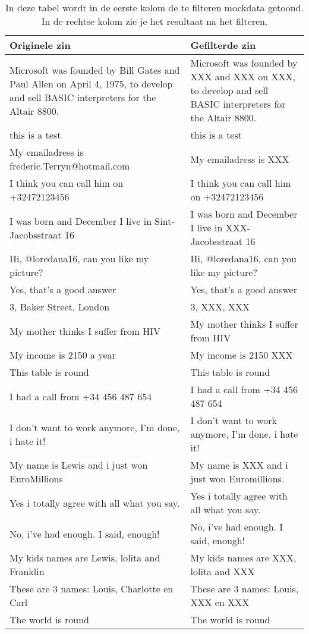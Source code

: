 \begin{table}
	\begin{tabularx}{\linewidth}{ |X|X| } 
	\hline
	Originele zin & Gefilterde zin \\ \hline \hline
	Microsoft was founded by Bill Gates and Paul Allen on April 4, 1975, to develop and sell BASIC interpreters for the Altair 8800. & Microsoft was founded by XXX and XXX on XXX, to develop and sell BASIC interpreters for the Altair 8800.\\
	this is a test & this is a test\\
	My emailadress is frederic.Terryn@hotmail.com &  My emailadress is XXX \\
	I think you can call him on +32472123456 & I think you can call him on +32472123456 \\
	I was born and December I live in Sint-Jacobsstraat 16 &  I was born and December I live in XXX-Jacobsstraat 16 \\
	Hi, @loredana16, can you like my picture? & Hi, @loredana16, can you like my picture? \\
	Yes, that's a good answer &  Yes, that's a good answer \\
	3, Baker Street, London & 3, XXX, XXX \\
	My mother thinks I suffer from HIV & My mother thinks I suffer from HIV \\
	My income is 2150 a year & My income is 2150 XXX \\
	This table is round &  This table is round \\
	I had a call from +34 456 487 654 &  I had a call from +34 456 487 654 \\
	I don't want to work anymore, I'm done, i hate it! &  I don't want to work anymore, I'm done, i hate it! \\
	My name is Lewis and i just won EuroMillions &  My name is XXX and i just won Euromillions. \\
	Yes i totally agree with all what you say. &  Yes i totally agree with all what you say. \\
	No, i've had enough. I said, enough! &  No, i've had enough. I said, enough! \\
	My kids names are Lewis, lolita and Franklin &  My kids names are XXX, lolita and XXX \\
	These are 3 names: Louis, Charlotte en Carl&  These are 3 names: Louis, XXX en XXX \\
	The world is round & The world is round \\
	\hline
	
	\end{tabularx}
\caption{In deze tabel wordt in de eerste kolom de te filteren mockdata getoond. In de rechtse kolom zie je het resultaat na het filteren.}
\end{table}


